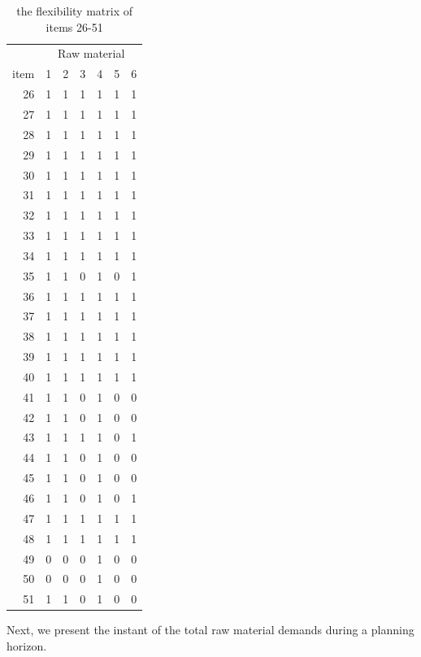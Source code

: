\documentclass[preprint, 3p,
authoryear]{elsarticle} %
\begin{document}
\begin{table}[!h]

\caption{\label{tab:unnamed-chunk-5}the flexibility matrix of items 26-51}
\centering
\begin{tabular}[t]{r|r|r|r|r|r|r}
\hline
\multicolumn{1}{c|}{ } & \multicolumn{6}{c}{Raw material} \\
\cline{2-7}
item & 1 & 2 & 3 & 4 & 5 & 6\\
\hline
26 & 1 & 1 & 1 & 1 & 1 & 1\\
\hline
27 & 1 & 1 & 1 & 1 & 1 & 1\\
\hline
28 & 1 & 1 & 1 & 1 & 1 & 1\\
\hline
29 & 1 & 1 & 1 & 1 & 1 & 1\\
\hline
30 & 1 & 1 & 1 & 1 & 1 & 1\\
\hline
31 & 1 & 1 & 1 & 1 & 1 & 1\\
\hline
32 & 1 & 1 & 1 & 1 & 1 & 1\\
\hline
33 & 1 & 1 & 1 & 1 & 1 & 1\\
\hline
34 & 1 & 1 & 1 & 1 & 1 & 1\\
\hline
35 & 1 & 1 & 0 & 1 & 0 & 1\\
\hline
36 & 1 & 1 & 1 & 1 & 1 & 1\\
\hline
37 & 1 & 1 & 1 & 1 & 1 & 1\\
\hline
38 & 1 & 1 & 1 & 1 & 1 & 1\\
\hline
39 & 1 & 1 & 1 & 1 & 1 & 1\\
\hline
40 & 1 & 1 & 1 & 1 & 1 & 1\\
\hline
41 & 1 & 1 & 0 & 1 & 0 & 0\\
\hline
42 & 1 & 1 & 0 & 1 & 0 & 0\\
\hline
43 & 1 & 1 & 1 & 1 & 0 & 1\\
\hline
44 & 1 & 1 & 0 & 1 & 0 & 0\\
\hline
45 & 1 & 1 & 0 & 1 & 0 & 0\\
\hline
46 & 1 & 1 & 0 & 1 & 0 & 1\\
\hline
47 & 1 & 1 & 1 & 1 & 1 & 1\\
\hline
48 & 1 & 1 & 1 & 1 & 1 & 1\\
\hline
49 & 0 & 0 & 0 & 1 & 0 & 0\\
\hline
50 & 0 & 0 & 0 & 1 & 0 & 0\\
\hline
51 & 1 & 1 & 0 & 1 & 0 & 0\\
\hline
\end{tabular}
\end{table}

Next, we present the instant of the total raw material demands during a
planning horizon.
\end{document}
